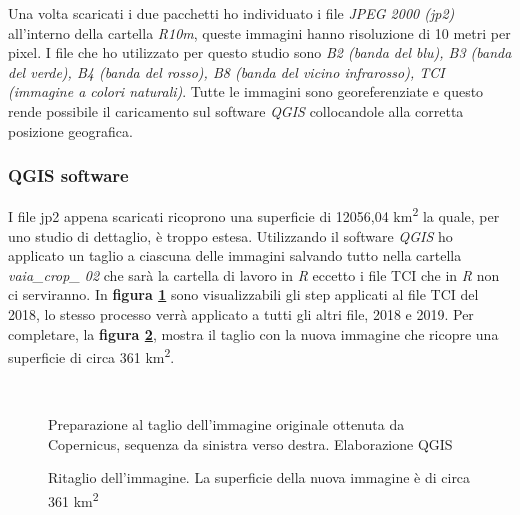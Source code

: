 \documentclass[a4paper,12pt]{article}
\begin{document}
Una volta scaricati i due pacchetti ho individuato i file \textit{JPEG 2000 (jp2)} all'interno della cartella \textit{R10m}, queste immagini hanno risoluzione di 10 metri per pixel. I file che ho utilizzato per questo studio sono \textit{B2 (banda del blu), B3 (banda del verde), B4 (banda del rosso), B8 (banda del vicino infrarosso), TCI (immagine a colori naturali)}. Tutte le immagini sono georeferenziate e questo rende possibile il caricamento sul software \textit{QGIS} collocandole alla corretta posizione geografica.

\subsubsection{QGIS software}

I file jp2 appena scaricati ricoprono una superficie di 12056,04 km\textsuperscript{2} la quale, per uno studio di dettaglio, è troppo estesa. Utilizzando il software \textit{QGIS} ho applicato un taglio a ciascuna delle immagini salvando tutto nella cartella \textit{vaia\_crop\_ 02} che sarà la cartella di lavoro in \textit{R} eccetto i file TCI che in \textit{R} non ci serviranno. In \textbf{figura \ref{fig:qgis_step}} sono visualizzabili gli step applicati al file TCI del 2018, lo stesso processo verrà applicato a tutti gli altri file, 2018 e 2019. Per completare, la \textbf{figura \ref{fig:areacrop}}, mostra il taglio con la nuova immagine che ricopre una superficie di circa 361 km\textsuperscript{2}.

\begin{figure}
\centering
    \setlength{\fboxsep}{0pt}%
    \setlength{\fboxrule}{1pt}%
     \\
    \caption{Preparazione al taglio dell'immagine originale ottenuta da Copernicus, sequenza da sinistra verso destra. Elaborazione QGIS}
    \label{fig:qgis_step}
\end{figure}

\begin{figure}
\centering
    \setlength{\fboxsep}{0pt}%
    \setlength{\fboxrule}{1pt}%
    \caption{Ritaglio dell'immagine. La superficie della nuova immagine è di circa 361 km\textsuperscript{2}}
    \label{fig:areacrop}
\end{figure}
\end{document}
